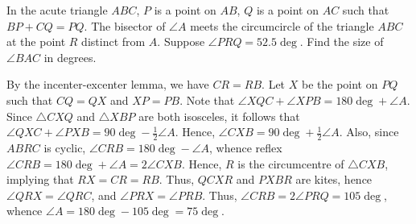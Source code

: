 \begin{question}[75]\label{Q::2021-O-1-23}
    In the acute triangle $ABC$, $P$ is a point on $AB$, $Q$ is a point on $AC$ such that $BP + CQ = PQ$. The bisector of $\angle A$ meets the circumcircle of the triangle $ABC$ at the point $R$ distinct from $A$. Suppose $\angle PRQ = 52.5\deg$. Find the size of $\angle BAC$ in degrees.
\end{question}
\begin{center}
\end{center}
\begin{solution*}
    By the incenter-excenter lemma, we have $CR = RB$. Let $X$ be the point on $PQ$ such that $CQ = QX$ and $XP = PB$. Note that $\angle XQC + \angle XPB = 180\deg + \angle A$. Since $\triangle CXQ$ and $\triangle XBP$ are both isosceles, it follows that $\angle QXC + \angle PXB = 90\deg - \frac12 \angle A$. Hence, $\angle CXB = 90\deg + \frac12 \angle A$. Also, since $ABRC$ is cyclic, $\angle CRB = 180\deg - \angle A$, whence reflex $\angle CRB = 180 \deg + \angle A = 2\angle CXB$. Hence, $R$ is the circumcentre of $\triangle CXB$, implying that $RX = CR = RB$. Thus, $QCXR$ and $PXBR$ are kites, hence $\angle QRX = \angle QRC$, and $\angle PRX = \angle PRB$. Thus, $\angle CRB = 2\angle PRQ = 105\deg$, whence $\angle A = 180\deg - 105\deg = 75\deg$.
\end{solution*}

